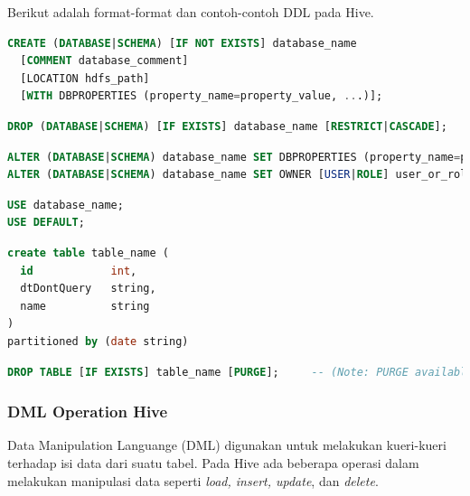 Berikut adalah format-format dan contoh-contoh DDL pada Hive.

\begin{lstlisting}[language=sql,basicstyle=\tiny,caption=DDL untuk create database]
CREATE (DATABASE|SCHEMA) [IF NOT EXISTS] database_name
  [COMMENT database_comment]
  [LOCATION hdfs_path]
  [WITH DBPROPERTIES (property_name=property_value, ...)];
\end{lstlisting}

\begin{lstlisting}[language=sql,basicstyle=\tiny,caption=DDL untuk drop database]
DROP (DATABASE|SCHEMA) [IF EXISTS] database_name [RESTRICT|CASCADE];
\end{lstlisting}

\begin{lstlisting}[language=sql,basicstyle=\tiny,caption=DDL untuk alter database]
ALTER (DATABASE|SCHEMA) database_name SET DBPROPERTIES (property_name=property_value, ...);   -- (Note: SCHEMA added in Hive 0.14.0)
ALTER (DATABASE|SCHEMA) database_name SET OWNER [USER|ROLE] user_or_role;   -- (Note: Hive 0.13.0 and later; SCHEMA added in Hive 0.14.0)
\end{lstlisting}

\begin{lstlisting}[language=sql,basicstyle=\tiny,caption=DDL untuk use database]
USE database_name;
USE DEFAULT;
\end{lstlisting}

\begin{lstlisting}[language=sql,basicstyle=\tiny,caption=Contoh DDL untuk membuat tabel dengan partisi]
create table table_name (
  id			int,
  dtDontQuery	string,
  name			string
)
partitioned by (date string)
\end{lstlisting}

\begin{lstlisting}[language=sql,basicstyle=\tiny,caption=Contoh DDL untuk drop tabel]
DROP TABLE [IF EXISTS] table_name [PURGE];     -- (Note: PURGE available in Hive 0.14.0 and later)
\end{lstlisting}

\subsubsection{DML Operation Hive}
Data Manipulation Languange (DML) digunakan untuk melakukan kueri-kueri terhadap isi data dari suatu tabel. Pada Hive ada beberapa operasi dalam melakukan manipulasi data seperti \textit{load, insert, update}, dan \textit{delete}. 

